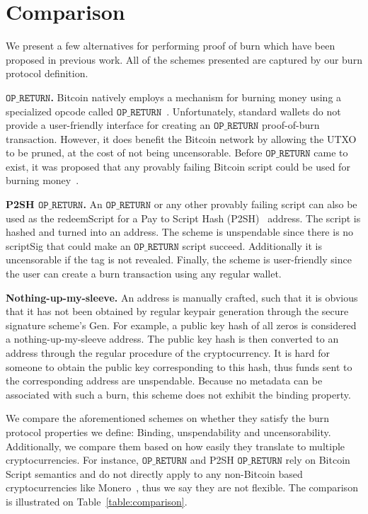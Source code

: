 \section{Comparison}

We present a few alternatives for performing proof of burn which have been proposed in previous work. All of the schemes presented are captured by our burn protocol definition.

\newcommand{\opreturn}{\texttt{OP\_RETURN}}

\noindent
\textbf{$\opreturn$.}
Bitcoin natively employs a mechanism for burning money using a specialized
opcode called $\opreturn$~\cite{bartoletti2017analysis}. Unfortunately,
standard wallets do not provide a user-friendly interface for creating an $\opreturn$ proof-of-burn transaction.
However, it does benefit the Bitcoin network by allowing the UTXO
to be pruned, at the cost of not being uncensorable.
Before $\opreturn$ came to exist, it was proposed that any provably failing Bitcoin script could be used for burning money~\cite{stewart}.

\noindent
\textbf{P2SH $\opreturn$.}
An $\opreturn$ or any other provably failing script can also be used as the redeemScript for a Pay to Script Hash (P2SH)~\cite{p2sh} address. The script is hashed and turned into an address. The scheme is unspendable since there is no scriptSig that could make an $\opreturn$ script succeed. Additionally it is uncensorable if the tag is not revealed. Finally, the scheme is user-friendly since the user can create a burn transaction using any regular wallet.

\noindent
\textbf{Nothing-up-my-sleeve.}
An address is manually crafted, such that it is obvious that it has not been obtained by regular keypair generation through the secure signature scheme's \textsf{Gen}. For example, a public key hash of all zeros is considered a nothing-up-my-sleeve address. The public key hash is then converted to an address through the regular procedure of the cryptocurrency. It is hard for someone to obtain the public key corresponding to this hash, thus funds sent to the corresponding address are unspendable. Because no metadata can be associated with such a burn, this scheme does not exhibit the binding property.

We compare the aforementioned schemes on whether they satisfy the burn protocol properties we define: Binding, unspendability and uncensorability. Additionally, we compare them based on how easily they translate to multiple cryptocurrencies. For instance, $\opreturn$ and P2SH $\opreturn$ rely on Bitcoin Script semantics and do not directly apply to any non-Bitcoin based cryptocurrencies like Monero~\cite{van2013cryptonote}, thus we say they are not flexible. The comparison is illustrated on Table~\ref{table:comparison}.

